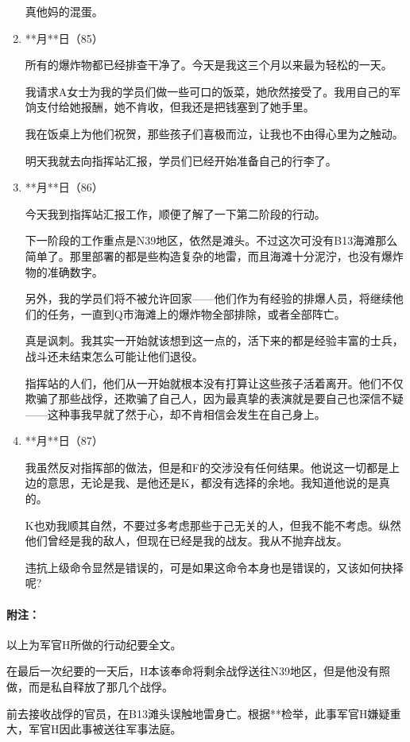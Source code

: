 \begin{enumerate}
真他妈的混蛋。
    \item **月**日（85）

所有的爆炸物都已经排查干净了。今天是我这三个月以来最为轻松的一天。

我请求A女士为我的学员们做一些可口的饭菜，她欣然接受了。我用自己的军饷支付给她报酬，她不肯收，但我还是把钱塞到了她手里。

我在饭桌上为他们祝贺，那些孩子们喜极而泣，让我也不由得心里为之触动。

明天我就去向指挥站汇报，学员们已经开始准备自己的行李了。
    \item **月**日（86）

今天我到指挥站汇报工作，顺便了解了一下第二阶段的行动。

下一阶段的工作重点是N39地区，依然是滩头。不过这次可没有B13海滩那么简单了。那里部署的都是些构造复杂的地雷，而且海滩十分泥泞，也没有爆炸物的准确数字。

另外，我的学员们将不被允许回家——他们作为有经验的排爆人员，将继续他们的任务，一直到Q市海滩上的爆炸物全部排除，或者全部阵亡。

真是讽刺。我其实一开始就该想到这一点的，活下来的都是经验丰富的士兵，战斗还未结束怎么可能让他们退役。

指挥站的人们，他们从一开始就根本没有打算让这些孩子活着离开。他们不仅欺骗了那些战俘，还欺骗了自己人，因为最真挚的表演就是要自己也深信不疑——这种事我早就了然于心，却不肯相信会发生在自己身上。
    \item **月**日（87）

我虽然反对指挥部的做法，但是和F的交涉没有任何结果。他说这一切都是上边的意思，无论是我、是他还是K，都没有选择的余地。我知道他说的是真的。

K也劝我顺其自然，不要过多考虑那些于己无关的人，但我不能不考虑。纵然他们曾经是我的敌人，但现在已经是我的战友。我从不抛弃战友。

违抗上级命令显然是错误的，可是如果这命令本身也是错误的，又该如何抉择呢?
\end{enumerate}
\lineseparator
\paragraph*{附注：}

以上为军官H所做的行动纪要全文。

在最后一次纪要的一天后，H本该奉命将剩余战俘送往N39地区，但是他没有照做，而是私自释放了那几个战俘。

前去接收战俘的官员，在B13滩头误触地雷身亡。根据**检举，此事军官H嫌疑重大，军官H因此事被送往军事法庭。

